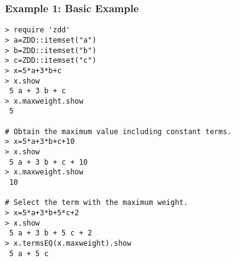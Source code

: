 \subsubsection*{Example 1: Basic Example}



\begin{Verbatim}[baselinestretch=0.7,frame=single]
> require 'zdd'
> a=ZDD::itemset("a")
> b=ZDD::itemset("b")
> c=ZDD::itemset("c")
> x=5*a+3*b+c
> x.show
 5 a + 3 b + c
> x.maxweight.show
 5

# Obtain the maximum value including constant terms. 
> x=5*a+3*b+c+10
> x.show
 5 a + 3 b + c + 10
> x.maxweight.show
 10

# Select the term with the maximum weight. 
> x=5*a+3*b+5*c+2
> x.show
 5 a + 3 b + 5 c + 2
> x.termsEQ(x.maxweight).show
 5 a + 5 c
\end{Verbatim}
